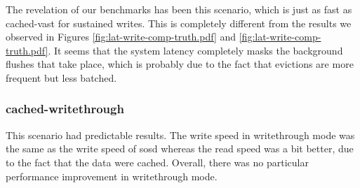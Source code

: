 The revelation of our benchmarks has been this scenario, which is just as fast
as cached-vast for sustained writes. This is completely different from the 
results we observed in Figures \ref{fig:lat-write-comp-truth.pdf} and 
\ref{fig:lat-write-comp-truth.pdf}. It seems that the system latency completely 
masks the background flushes that take place, which is  probably due to the 
fact that evictions are more frequent but less batched.

\subsubsection{cached-writethrough}

This scenario had predictable results. The write speed in writethrough mode was 
the same as the write speed of sosd whereas the read speed was a bit better, 
due to the fact that the data were cached. Overall, there was no particular 
performance improvement in writethrough mode.


